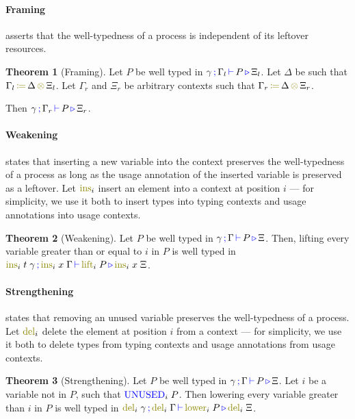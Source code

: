 \documentclass[sigplan,10pt,anonymous,review]{acmart}
\theoremstyle{definition}
\newtheorem{nitheorem}{Theorem}
\newcommand{\type}[1]{\textcolor{blue}{\operatorname{#1}}}
\newcommand{\func}[1]{\textcolor{olive}{\operatorname{#1}}}
\newcommand{\opctx}[3]{#1 \, \func{\coloneqq} \, #2 \, \func{\otimes} \, #3}
\newcommand{\types}[4]{#1 \, \type{;} \, #2 \, \type{\vdash} \, #3 \, \type{\triangleright} \, #4}
\newcommand{\Unused}{\type{UNUSED}}
\begin{document}
\paragraph*{Framing}
asserts that the well-typedness of a process is independent of its leftover resources.

\begin{nitheorem}[Framing]
  \label{thm:framing}
  Let $P$ be well typed in $\types{\gamma}{\Gamma_l}{P}{\Xi_l}$.
  Let $\Delta$ be such that $\opctx{\Gamma_l}{\Delta}{\Xi_l}$.
  Let $\Gamma_r$ and $\Xi_r$ be arbitrary contexts such that $\opctx{\Gamma_r}{\Delta}{\Xi_r}$.

  Then $\types{\gamma}{\Gamma_r}{P}{\Xi_r}$.
\end{nitheorem}

\paragraph*{Weakening}
states that inserting a new variable into the context preserves the well-typedness of a process as long as the usage annotation of the inserted variable is preserved as a leftover.
Let $\func{ins}_i$ insert an element into a context at position $i$ --- for simplicity, we use it both to insert types into typing contexts and usage annotations into usage contexts.
\begin{nitheorem}[Weakening]
  \label{thm:weakening}
  Let $P$ be well typed in $\types{\gamma}{\Gamma}{P}{\Xi}$.
  Then, lifting every variable greater than or equal to $i$ in $P$ is well typed in
  $\types{\func{ins}_i \; t \; \gamma}{\func{ins}_i \; x \; \Gamma}{\func{lift}_i \; P}{\func{ins}_i \; x \; \Xi}$.
\end{nitheorem}

\paragraph*{Strengthening}
states that removing an unused variable preserves the well-typedness of a process.
Let $\func{del}_i$ delete the element at position $i$ from a context --- for simplicity, we use it both to delete types from typing contexts and usage annotations from usage contexts.
\begin{nitheorem}[Strengthening]
  \label{thm:strengthening} 
  Let $P$ be well typed in $\types{\gamma}{\Gamma}{P}{\Xi}$.
  Let $i$ be a variable not in $P$, such that $\Unused_i \; P$.
  Then lowering every variable greater than $i$ in $P$ is well typed in $\types{\func{del}_i \; \gamma}{\func{del}_i \; \Gamma}{\func{lower}_i \; P}{\func{del}_i \; \Xi}$.
\end{nitheorem}
\end{document}
